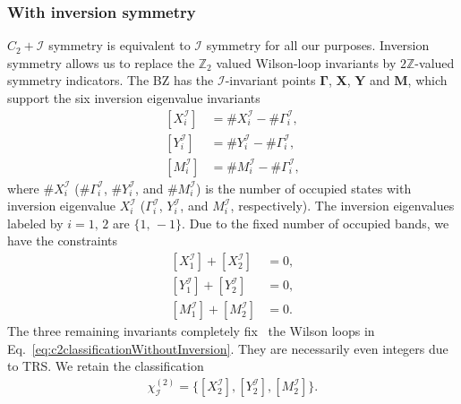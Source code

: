 \subsubsection*{With inversion symmetry}
$C_2 + \mathcal{I}$ symmetry is equivalent to $\mathcal{I}$ symmetry for all our purposes. Inversion symmetry allows us to replace the $\mathbb{Z}_2$ valued Wilson-loop invariants by $2\mathbb{Z}$-valued symmetry indicators. The BZ has the $\mathcal{I}$-invariant points $\mathbf{\Gamma}$, $\mathbf{X}$, $\mathbf{Y}$ and $\mathbf{M}$, which support the six inversion eigenvalue invariants
\begin{equation}
\begin{aligned}
[X^\mathcal{I}_i]&= \#X^\mathcal{I}_i - \#\Gamma^{\mathcal{I}}_i,  \\
[Y^\mathcal{I}_i]&= \#Y^\mathcal{I}_i - \#\Gamma^{\mathcal{I}}_i,  \\
[M^\mathcal{I}_i]&= \#M^\mathcal{I}_i - \#\Gamma^{\mathcal{I}}_i,
 \end{aligned} 
\end{equation}
where $\#X^\mathcal{I}_i$ ($\#\Gamma^{\mathcal{I}}_i$, $\# Y^{\mathcal{I}}_i$, and $\# M^{\mathcal{I}}_i$) is the number of occupied states with inversion eigenvalue $X^\mathcal{I}_i$ ($\Gamma^{\mathcal{I}}_i$, $Y^{\mathcal{I}}_i$, and $M^{\mathcal{I}}_i$, respectively). The inversion eigenvalues labeled by $i=1, \, 2$ are $\lbrace 1, \,-1 \rbrace$. Due to the fixed number of occupied bands, we have the constraints
\begin{equation} 
\begin{aligned}
[X^\mathcal{I}_1]+[X^\mathcal{I}_2]&=0,  \\
[Y^\mathcal{I}_1]+[Y^\mathcal{I}_2]&=0,  \\
[M^\mathcal{I}_1]+[M^\mathcal{I}_2]&=0.
 \end{aligned} 
\label{eq:constraintsoninversioneigvals} 
 \end{equation}
The three remaining invariants completely fix~\cite{PhysRevB.89.155114} the Wilson loops in Eq.~\eqref{eq:c2classificationWithoutInversion}. They are necessarily even integers due to TRS. We retain the classification
\begin{equation}
 \begin{aligned}
\chi^{(2)}_\mathcal{I} = \{[X^\mathcal{I}_2],[Y^\mathcal{I}_2],[M^\mathcal{I}_2]\}.
\end{aligned} 
\label{eq:c2classificationWithInversion}
\end{equation}

